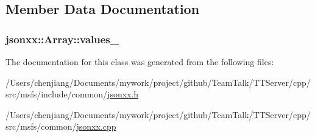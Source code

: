 \subsection{Member Data Documentation}
\hypertarget{classjsonxx_1_1_array_aa6da6cdf631333feee9062fa76af54b4}{}
\subsubsection[{values\+\_\+}]{ jsonxx\+::\+Array\+::values\+\_\+\hspace{0.3cm}{\ttfamily [protected]}}\label{classjsonxx_1_1_array_aa6da6cdf631333feee9062fa76af54b4}


The documentation for this class was generated from the following files\+:\begin{DoxyCompactItemize}
\item 
/\+Users/chenjiang/\+Documents/mywork/project/github/\+Team\+Talk/\+T\+T\+Server/cpp/src/msfs/include/common/\hyperlink{msfs_2include_2common_2jsonxx_8h}{jsonxx.\+h}\item 
/\+Users/chenjiang/\+Documents/mywork/project/github/\+Team\+Talk/\+T\+T\+Server/cpp/src/msfs/common/\hyperlink{msfs_2common_2jsonxx_8cpp}{jsonxx.\+cpp}\end{DoxyCompactItemize}
